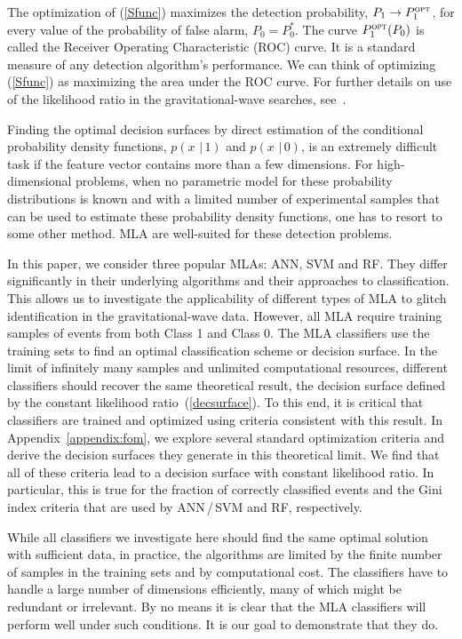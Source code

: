 \documentclass[prd, twocolumn, lengthcheck, superscriptaddress, showpacs, letterpaper, nofootinbib]{revtex4-1}
\newcommand\given{\,\,|\,}
\newcommand\auxvec{x}
\newcommand\Pt{\ensuremath{P_0^\ast}}
\begin{document}
The optimization of (\ref{Sfunc})  maximizes the detection probability, $P_{1}\rightarrow P_1^{\textsc{opt}}$, for every value of the probability of false alarm, $P_{0} = \Pt$. The curve $P_{1}^{\textsc{opt}}(P_{0})$ is called the Receiver Operating Characteristic (\ac{ROC}) curve. It is a standard measure of any detection algorithm's performance. We can think of optimizing (\ref{Sfunc}) as maximizing the area under the \ac{ROC} curve. For further details on use of the likelihood ratio in the gravitational-wave searches, see~\cite{Biswas2012a,Biswas2012b}. 

Finding the optimal decision surfaces by direct estimation of the conditional probability density functions, $p(\auxvec \given 1)$ and $p(\auxvec \given 0)$, is an extremely difficult task if the feature vector contains more than a few dimensions. For high-dimensional problems, when no parametric model for these probability distributions is known and with a limited number of experimental samples that can be used to estimate these probability density functions, one has to resort to some other method. \ac{MLA} are well-suited for these detection problems. 

In this paper, we consider three popular \ac{MLA}s: \ac{ANN}, \ac{SVM} and \ac{RF}. They differ significantly in their underlying algorithms and their approaches to classification. This allows us to investigate the applicability of different types of \ac{MLA} to glitch identification in the gravitational-wave data. However, all \ac{MLA} require training  samples of events from both Class 1 and Class 0. The \ac{MLA} classifiers use the training sets to find an optimal classification scheme or decision surface. In the limit of infinitely many samples and unlimited computational resources, different classifiers should recover the same theoretical result, the decision surface defined by the constant likelihood ratio~(\ref{decsurface}). To this end, it is critical that classifiers are trained and optimized using criteria consistent with this result. In Appendix~\ref{appendix:fom}, we explore several standard optimization criteria and derive the decision surfaces they generate in this theoretical limit. We find that all of these criteria lead to a decision surface with constant likelihood ratio. In particular, this is true for the fraction of correctly classified events  and the Gini index criteria that are used by  \ac{ANN}\,/\,\ac{SVM} and  \ac{RF}, respectively.

While all classifiers we investigate here should find the same optimal solution with sufficient data, in practice, the algorithms are limited by the finite number of samples in the training sets and by computational cost. The classifiers have to handle a large number of dimensions efficiently, many of which might be redundant or irrelevant. By no means it is clear that the \ac{MLA} classifiers will perform well under such conditions. It is our goal to demonstrate that they do.
\end{document}
